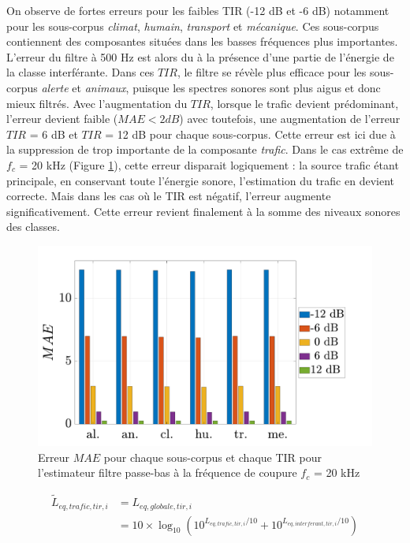 On observe de fortes erreurs pour les faibles TIR (-12 dB et -6 dB) notamment pour les sous-corpus \textit{climat}, \textit{humain}, \textit{transport} et \textit{mécanique}. Ces sous-corpus contiennent des composantes situées dans les basses fréquences plus importantes. L'erreur du filtre à 500 Hz est alors du à la présence d'une partie de l'énergie de la classe interférante. Dans ces $TIR$, le filtre se révèle plus efficace pour les sous-corpus \textit{alerte} et \textit{animaux}, puisque les spectres sonores sont plus aigus et donc mieux filtrés.
Avec l'augmentation du $TIR$, lorsque le trafic devient prédominant, l'erreur devient faible ($MAE < 2 dB$) avec toutefois, une augmentation de l'erreur $TIR$ =  6 dB et $TIR$ = 12 dB pour chaque sous-corpus. Cette erreur est ici due à la suppression de trop importante de la composante \textit{trafic}. Dans le cas extrême de $f_c$ = 20 kHz (Figure \ref{fig:filtre_amb_tir_20k}), cette erreur disparait logiquement : la source trafic étant principale, en conservant toute l'énergie sonore, l'estimation du trafic en devient correcte. Mais dans les cas où le TIR est négatif, l'erreur augmente significativement. Cette erreur revient finalement à la somme des niveaux sonores des classes.

\begin{figure}[h]
\centering
\includegraphics[width=0.7\linewidth]{./figures/resultats/amb_filtre_20k_bar.pdf}
\caption{Erreur $MAE$ pour chaque sous-corpus et chaque TIR pour l'estimateur filtre passe-bas à la fréquence de coupure $f_c$ = 20 kHz}
\label{fig:filtre_amb_tir_20k}
\end{figure}

\begin{subequations}
\begin{align}
\tilde{L}_{eq,trafic,tir,i} &= L_{eq,globale,tir,i}\\
 & = 10\times \log_{10}\left(10^{L_{eq,trafic,tir,i}/10}+10^{L_{eq,interferant,tir,i}/10}\right)
\end{align}
\end{subequations}


